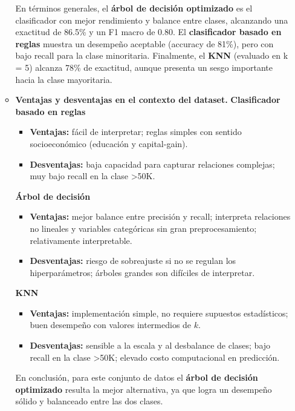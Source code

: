 \documentclass[12pt,a4paper]{article}
\begin{document}
\begin{enumerate}
\begin{itemize}
        En términos generales, el \textbf{árbol de decisión optimizado} es el clasificador con mejor rendimiento y balance entre clases, 
        alcanzando una exactitud de 86.5\% y un F1 macro de 0.80. El \textbf{clasificador basado en reglas} muestra un desempeño aceptable 
        (accuracy de 81\%), pero con bajo recall para la clase minoritaria. Finalmente, el \textbf{KNN} (evaluado en k = 5) alcanza 78\% de exactitud, aunque 
        presenta un sesgo importante hacia la clase mayoritaria.

        \item \textbf{Ventajas y desventajas en el contexto del dataset.}
        \textbf{Clasificador basado en reglas}

        \begin{itemize}
            \item \textbf{Ventajas:} fácil de interpretar; reglas simples con sentido socioeconómico (educación y capital-gain).
            \item \textbf{Desventajas:} baja capacidad para capturar relaciones complejas; muy bajo recall en la clase >50K.
        \end{itemize}

        \textbf{Árbol de decisión}
        \begin{itemize}
            \item \textbf{Ventajas:} mejor balance entre precisión y recall; interpreta relaciones no lineales y variables categóricas sin gran preprocesamiento; relativamente interpretable.
            \item \textbf{Desventajas:} riesgo de sobreajuste si no se regulan los hiperparámetros; árboles grandes son difíciles de interpretar.
        \end{itemize}

        \textbf{KNN}
        \begin{itemize}
            \item \textbf{Ventajas:} implementación simple, no requiere supuestos estadísticos; buen desempeño con valores intermedios de $k$.
            \item \textbf{Desventajas:} sensible a la escala y al desbalance de clases; bajo recall en la clase >50K; elevado costo computacional en predicción.
        \end{itemize}

        En conclusión, para este conjunto de datos el \textbf{árbol de decisión optimizado} resulta la mejor alternativa, ya que logra un 
        desempeño sólido y balanceado entre las dos clases.
      \end{itemize}


\end{enumerate}
\end{document}
